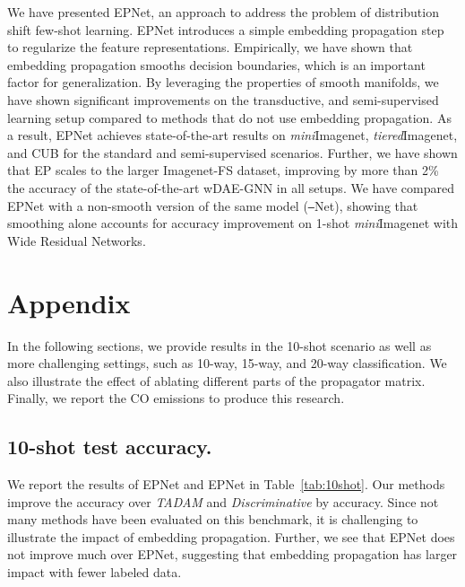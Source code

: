\documentclass[runningheads]{llncs}
\begin{document}
We have presented EPNet, an approach to address the problem of distribution shift few-shot learning. EPNet introduces a simple embedding propagation step to regularize the feature representations. Empirically, we have shown that embedding propagation smooths decision boundaries, which is an important factor for generalization. By leveraging the properties of smooth manifolds, we have shown significant improvements on the transductive, and semi-supervised learning setup compared to methods that do not use embedding propagation. As a result, EPNet achieves state-of-the-art results on \textit{mini}Imagenet, \textit{tiered}Imagenet, and CUB for the standard and semi-supervised scenarios. Further, we have shown that EP scales to the larger Imagenet-FS dataset, improving by more than 2\% the accuracy of the state-of-the-art wDAE-GNN \cite{gidaris2019generating} in all setups. We have compared EPNet with a non-smooth version of the same model (\texttt{--}Net), showing that smoothing alone accounts for  accuracy improvement on 1-shot \emph{mini}Imagenet with Wide Residual Networks. 

\clearpage



\clearpage
\appendix
\section*{Appendix}
In the following sections, we provide results in the 10-shot scenario as well as more challenging settings, such as 10-way, 15-way, and 20-way classification. We also illustrate the effect of ablating different parts of the propagator matrix. Finally, we report the CO emissions to produce this research.


\subsection*{10-shot test accuracy.} We report the results of EPNet and EPNet in Table~\ref{tab:10shot}. Our methods improve the accuracy over \textit{TADAM} \cite{oreshkin2018tadam} and \textit{Discriminative} \cite{bauer2017discriminative} by  accuracy. Since not many methods have been evaluated on this benchmark, it is challenging to illustrate the impact of embedding propagation. Further, we see that EPNet does not improve much over EPNet, suggesting that embedding propagation has larger impact with fewer labeled data.
\end{document}
